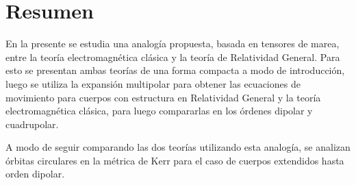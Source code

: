 \chapter*{Resumen}

En la presente se estudia una analogía propuesta, basada en tensores de marea, entre la teoría electromagnética clásica y la teoría de Relatividad General. Para esto se presentan ambas teorías de una forma compacta a modo de introducción, luego se utiliza la expansión multipolar para obtener las ecuaciones de movimiento para cuerpos con estructura en Relatividad General y la teoría electromagnética clásica, para luego compararlas en los órdenes dipolar y cuadrupolar.

A modo de seguir comparando las dos teorías utilizando esta analogía, se analizan órbitas circulares en la métrica de Kerr para el caso de cuerpos extendidos hasta orden dipolar.